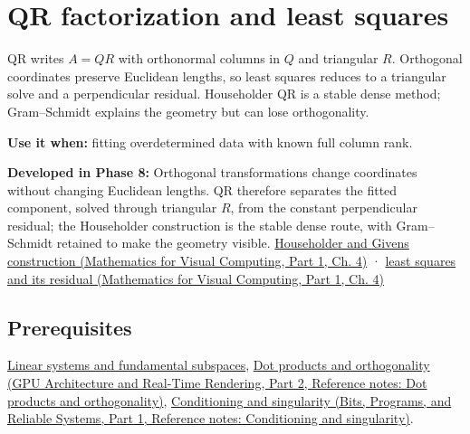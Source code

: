 \hypertarget{appendix-c3421e6b4f2c}{}\label{referencestart:appendix-c3421e6b4f2c}
\section{QR factorization and least squares}\label{appendix-c3421e6b4f2c-qr-factorization-and-least-squares}

\hypertarget{appendix-c3421e6b4f2c-qr-factorization-and-least-squares}{}

QR writes \(A=QR\) with orthonormal columns in \(Q\) and triangular \(R\). Orthogonal coordinates preserve Euclidean lengths, so least squares reduces to a triangular solve and a perpendicular residual. Householder QR is a stable dense method; Gram--Schmidt explains the geometry but can lose orthogonality.

\textbf{Use it when:} fitting overdetermined data with known full column rank.

\textbf{Developed in Phase 8:} Orthogonal transformations change coordinates without changing Euclidean lengths. QR therefore separates the fitted component, solved through triangular \(R\), from the constant perpendicular residual; the Householder construction is the stable dense route, with Gram--Schmidt retained to make the geometry visible. \href{../02-Mathematics-for-Visual-Computing-P01/main.pdf\#nameddest=01-foundations-i-ch020-reflections-and-plane-rotations-build-qr-without-losing-lengths}{Householder and Givens construction (Mathematics for Visual Computing, Part 1, Ch. 4)} · \href{../02-Mathematics-for-Visual-Computing-P01/main.pdf\#nameddest=01-foundations-i-ch020-qr-turns-least-squares-into-a-triangular-solve-plus-an-irreducible-residual}{least squares and its residual (Mathematics for Visual Computing, Part 1, Ch. 4)}

\subsection{Prerequisites}\label{appendix-c3421e6b4f2c-prerequisites}

\hypertarget{appendix-c3421e6b4f2c-prerequisites}{}

\hyperref[appendix-8572a4a060c1]{Linear systems and fundamental subspaces}, \href{../06-GPU-Architecture-and-Real-Time-Rendering-P02/main.pdf\#nameddest=appendix-8bc4e8fc547c}{Dot products and orthogonality (GPU Architecture and Real-Time Rendering, Part 2, Reference notes: Dot products and orthogonality)}, \href{../01-Bits-Programs-and-Reliable-Systems-P01/main.pdf\#nameddest=appendix-8f6a01f284a7}{Conditioning and singularity (Bits, Programs, and Reliable Systems, Part 1, Reference notes: Conditioning and singularity)}.


